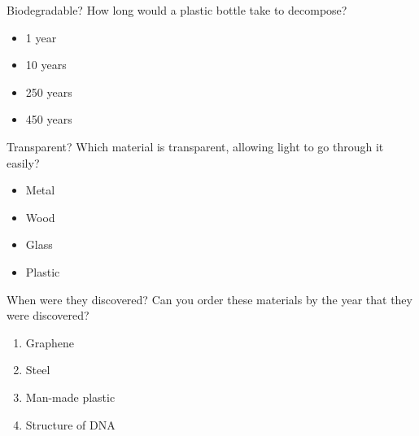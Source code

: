 \documentclass[a4paper, 12pt]{article}
\begin{document}
	\begin{question}[colback=cyan!10]{Biodegradable?}
  		How long would a plastic bottle take to decompose?
  		\begin{itemize}
  		\centering
  			\item 1 year
  			\item 10 years
  			\item 250 years
  			\item 450 years
  		\end{itemize}
	\end{question}
	\newpage
	\begin{question}[]{Transparent?}
		Which material is transparent, allowing light to go through it easily?
		\begin{itemize}
  		\centering
  			\item Metal
  			\item Wood
  			\item Glass
  			\item Plastic
  		\end{itemize}
	\end{question}
	\begin{question}[colback=orange!10]{When were they discovered?}
		Can you order these materials by the year that they were discovered?
		\begin{enumerate}
  		\centering
  			\item Graphene %
  			\item Steel %
  			\item Man-made plastic %
  			\item Structure of DNA %
  		\end{enumerate}
	\end{question}
\end{document}
